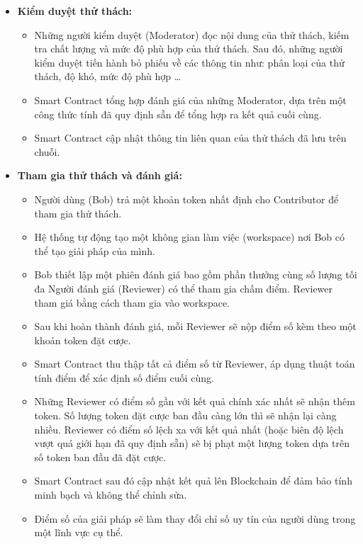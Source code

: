\documentclass{article}[14pt]
\begin{document}
{\begin{enumerate}[label=\textbf{\alph*.}]
\begin{itemize}
                    \item \textbf{Kiểm duyệt thử thách:}
                    \begin{itemize}
                        \item Những người kiểm duyệt (Moderator) đọc nội dung của thử thách, kiếm tra chất lượng và mức độ phù hợp của thử thách. Sau đó, những người kiểm duyệt tiến hành bỏ phiếu về các thông tin như: phân loại của thử thách, độ khó, mức độ phù hợp \dots
                        \item Smart Contract tổng hợp đánh giá của những Moderator, dựa trên một công thức tính đã quy định sẵn để tổng hợp ra kết quả cuối cùng. 
                        \item Smart Contract cập nhật thông tin liên quan của thử thách đã lưu trên chuỗi. 
                    \end{itemize} 

                    \item \textbf{Tham gia thử thách và đánh giá:}
                    \begin{itemize}
                        \item Người dùng (Bob) trả một khoản token nhất định cho Contributor để tham gia thử thách.
                        \item Hệ thống tự động tạo một không gian làm việc (workspace) nơi Bob có thể tạo giải pháp của mình. 
                        \item Bob thiết lập một phiên đánh giá bao gồm phần thưởng cùng số lượng tối đa Người đánh giá (Reviewer) có thể tham gia chấm điểm. Reviewer tham giá bằng cách tham gia vào workspace.
                        \item Sau khi hoàn thành đánh giá, mỗi Reviewer sẽ nộp điểm số kèm theo một khoản token đặt cược.
                        \item Smart Contract thu thập tất cả điểm số từ Reviewer, áp dụng thuật toán tính điểm để xác định số điểm cuối cùng.
                        \item Những Reviewer có điểm số gần với kết quả chính xác nhất sẽ nhận thêm token. Số lượng token đặt cược ban đầu càng lớn thì sẽ nhận lại càng nhiều. Reviewer có điểm số lệch xa với kết quả nhất (hoặc biên độ lệch vượt quá giới hạn đã quy định sẵn) sẽ bị phạt một lượng token dựa trên số token ban đầu đã đặt cược.  
                        \item Smart Contract sau đó cập nhật kết quả lên Blockchain để đảm bảo tính minh bạch và không thể chỉnh sửa.
                        \item Điểm số của giải pháp sẽ làm thay đổi chỉ số uy tín của người dùng trong một lĩnh vực cụ thể.
                    \end{itemize} 


\end{itemize}
\end{enumerate}}
\end{document}

